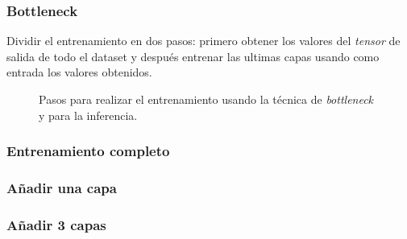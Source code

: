 \documentclass{beamer}
\begin{document}
\begin{frame}
\frametitle{Bottleneck}

Dividir el entrenamiento en dos pasos: primero obtener los valores del \textit{tensor} de salida de todo el dataset y después entrenar las ultimas capas usando como entrada los valores obtenidos.

\begin{figure}[H]
\centering
{}%
\qquad
{}%
\caption{Pasos para realizar el entrenamiento usando la técnica de \textit{bottleneck} y para la inferencia.}
\end{figure}

\end{frame}



\begin{frame}
\frametitle{Entrenamiento completo}

\end{frame}



\begin{frame}
\frametitle{Añadir una capa}

\end{frame}



\begin{frame}
\frametitle{Añadir 3 capas}

\end{frame}
\end{document}
